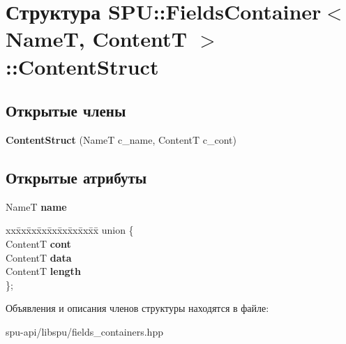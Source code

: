 \hypertarget{struct_s_p_u_1_1_fields_container_1_1_content_struct}{}\section{Структура S\+PU\+:\+:Fields\+Container$<$ NameT, ContentT $>$\+:\+:Content\+Struct}
\label{struct_s_p_u_1_1_fields_container_1_1_content_struct}
\subsection*{Открытые члены}
\begin{DoxyCompactItemize}
\item 
\mbox{\label{struct_s_p_u_1_1_fields_container_1_1_content_struct_ab6645fcbc525be9c8c75d07b58ab72d4}} 
{\bfseries Content\+Struct} (NameT c\+\_\+name, ContentT c\+\_\+cont)
\end{DoxyCompactItemize}
\subsection*{Открытые атрибуты}
\begin{DoxyCompactItemize}
\item 
\mbox{\label{struct_s_p_u_1_1_fields_container_1_1_content_struct_a6d13eec3a77c6d5cbb41a11f3f15aa80}} 
NameT {\bfseries name}
\item 
\mbox{\label{struct_s_p_u_1_1_fields_container_1_1_content_struct_a298bb38a5cf283514b536ad0010740a4}} 
\begin{tabbing}
xx\=xx\=xx\=xx\=xx\=xx\=xx\=xx\=xx\=\kill
union \{\\
\>ContentT {\bfseries cont}\\
\>ContentT {\bfseries data}\\
\>ContentT {\bfseries length}\\
\}; \\

\end{tabbing}\end{DoxyCompactItemize}


Объявления и описания членов структуры находятся в файле\+:\begin{DoxyCompactItemize}
\item 
spu-\/api/libspu/fields\+\_\+containers.\+hpp\end{DoxyCompactItemize}
